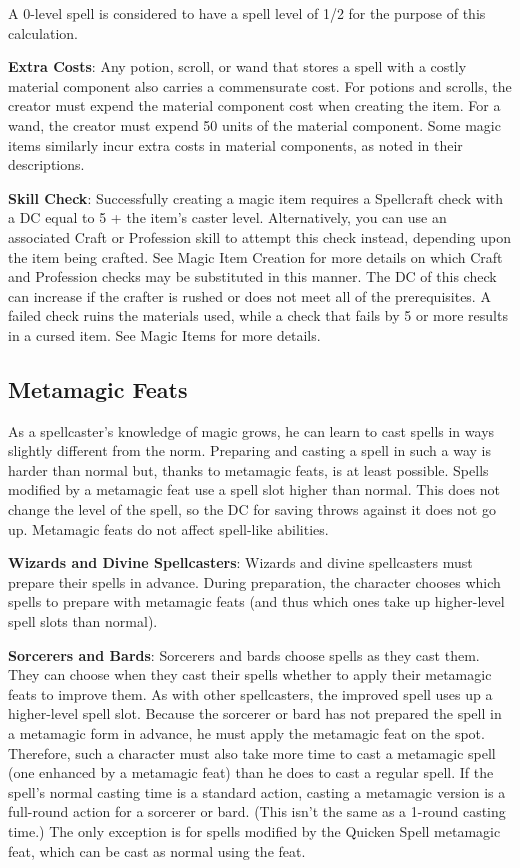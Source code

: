 A 0-level spell is considered to have a spell level of 1/2 for the purpose of this calculation.
				
\textbf{Extra Costs}: Any potion, scroll, or wand that stores a spell with a costly material component also carries a commensurate cost. For potions and scrolls, the creator must expend the material component cost when creating the item. For a wand, the creator must expend 50 units of the material component. Some magic items similarly incur extra costs in material components, as noted in their descriptions.
				
\textbf{Skill Check}: Successfully creating a magic item requires a Spellcraft check with a DC equal to 5 + the item's caster level. Alternatively, you can use an associated Craft or Profession skill to attempt this check instead, depending upon the item being crafted. See Magic Item Creation for more details on which Craft and Profession checks may be substituted in this manner. The DC of this check can increase if the crafter is rushed or does not meet all of the prerequisites. A failed check ruins the materials used, while a check that fails by 5 or more results in a cursed item. See Magic Items for more details.
								
\subsection{Metamagic Feats}

				
As a spellcaster's knowledge of magic grows, he can learn to cast spells in ways slightly different from the norm. Preparing and casting a spell in such a way is harder than normal but, thanks to metamagic feats, is at least possible. Spells modified by a metamagic feat use a spell slot higher than normal. This does not change the level of the spell, so the DC for saving throws against it does not go up. Metamagic feats do not affect spell-like abilities.
				
\textbf{Wizards and Divine Spellcasters}: Wizards and divine spellcasters must prepare their spells in advance. During preparation, the character chooses which spells to prepare with metamagic feats (and thus which ones take up higher-level spell slots than normal).
				
\textbf{Sorcerers and Bards}: Sorcerers and bards choose spells as they cast them. They can choose when they cast their spells whether to apply their metamagic feats to improve them. As with other spellcasters, the improved spell uses up a higher-level spell slot. Because the sorcerer or bard has not prepared the spell in a metamagic form in advance, he must apply the metamagic feat on the spot. Therefore, such a character must also take more time to cast a metamagic spell (one enhanced by a metamagic feat) than he does to cast a regular spell. If the spell's normal casting time is a standard action, casting a metamagic version is a full-round action for a sorcerer or bard. (This isn't the same as a 1-round casting time.) The only exception is for spells modified by the Quicken Spell metamagic feat, which can be cast as normal using the feat.
				
